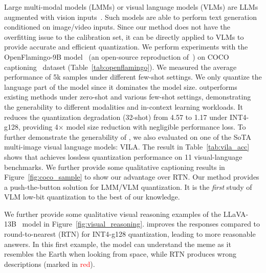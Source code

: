  Large multi-modal models (LMMs) or visual language models (VLMs) are LLMs augmented with vision inputs~\cite{alayrac2022flamingo,li2023blip,koh2023grounding,driess2023palm,zhang2023llama,liu2023llava}. Such models are able to perform text generation conditioned on image/video inputs. Since our method does not have the overfitting issue to the calibration set, it can be directly applied to VLMs to provide accurate and efficient quantization. 
We perform experiments with the OpenFlamingo-9B model~\cite{openflamingo} (an open-source reproduction of~\cite{alayrac2022flamingo}) on COCO captioning~\cite{chen2015microsoft} dataset (Table~\ref{tab:openflamingo}). We measured the average performance of 5k samples under different few-shot settings. We only quantize the language part of the model since it dominates the model size. 
\methodshort outperforms existing methods under zero-shot and various few-shot settings, demonstrating the generability to different modalities and in-context learning workloads. It reduces the quantization degradation (32-shot) from 4.57 to 1.17 under INT4-g128, providing 4$\times$ model size reduction with negligible performance loss. 
To further demonstrate the generability of \methodshort, we also evaluated \methodshort on one of the SoTA multi-image visual language models: VILA. The result in Table~\ref{tab:vila_acc} shows that \methodshort achieves lossless quantization performance on 11 visual-language benchmarks.
We further provide some qualitative captioning results in Figure~\ref{fig:coco_sample} to show our advantage over RTN.  
Our method provides a push-the-button solution for LMM/VLM quantization. It is the \emph{first} study of VLM low-bit quantization to the best of our knowledge.





We further provide some qualitative visual reasoning examples of the LLaVA-13B~\cite{liu2023llava} model in Figure~\ref{fig:visual_reasoning}. \methodshort improves the responses compared to round-to-nearest (RTN) for INT4-g128 quantization, leading to more reasonable answers. In this first example, the \methodshort model can understand the meme as it resembles the Earth when looking from space, while RTN produces wrong descriptions (marked in \textcolor{red}{red}). %

